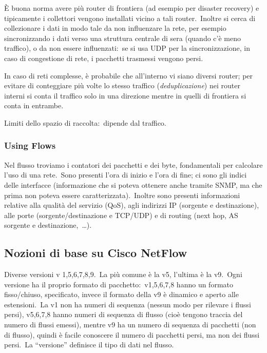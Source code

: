 È buona norma avere più router di frontiera (ad esempio per disaster recovery) e tipicamente i collettori vengono installati vicino a tali router.\
Inoltre si cerca di collezionare i dati in modo tale da non influenzare la rete, per esempio sincronizzando i dati verso una struttura centrale di sera (quando c'è meno traffico), o da non essere influenzati:\ se si usa UDP per la sincronizzazione, in caso di congestione di rete, i pacchetti trasmessi vengono persi.

In caso di reti complesse, è probabile che all'interno vi siano diversi router; per evitare di conteggiare più volte lo stesso traffico (\textit{deduplicazione}) nei router interni si conta il traffico solo in una direzione mentre in quelli di frontiera si conta in entrambe.

Limiti dello spazio di raccolta:\ dipende dal traffico.

\subsubsection{Using Flows}

Nel flusso troviamo i contatori dei pacchetti e dei byte, fondamentali per calcolare l'uso di una rete.\
Sono presenti l'ora di inizio e l'ora di fine; ci sono gli indici delle interfacce (informazione che si poteva ottenere anche tramite SNMP, ma che prima non poteva essere caratterizzata).\
Inoltre sono presenti informazioni relative alla qualità del servizio (QoS), agli indirizzi IP (sorgente e destinazione), alle porte (sorgente/destinazione e TCP/UDP) e di routing (next hop, AS sorgente e destinazione,\ \dots).

\subsection{Nozioni di base su Cisco NetFlow}

Diverse versioni v 1,5,6,7,8,9.\
La più comune è la v5, l'ultima è la v9.\
Ogni versione ha il proprio formato di pacchetto:\ v1,5,6,7,8 hanno un formato fisso/chiuso, specificato, invece il formato della v9 è dinamico e aperto alle estensioni.\
La v1 non ha numeri di sequenza (nessun modo per rilevare i flussi persi), v5,6,7,8 hanno numeri di sequenza di flusso (cioè tengono traccia del numero di flussi emessi), mentre v9 ha un numero di sequenza di pacchetti (non di flusso), quindi è facile conoscere il numero di pacchetti persi, ma non dei flussi persi.\
La ``versione'' definisce il tipo di dati nel flusso.\

